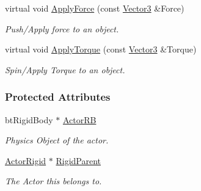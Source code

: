 \begin{DoxyCompactItemize}
virtual void \hyperlink{classphys_1_1ActorRigidPhysicsSettings_a3738b083fd0c21e07176c302f63ce993}{ApplyForce} (const \hyperlink{classphys_1_1Vector3}{Vector3} \&Force)
\begin{DoxyCompactList}\small\item\em Push/Apply force to an object. \item\end{DoxyCompactList}\item 
virtual void \hyperlink{classphys_1_1ActorRigidPhysicsSettings_ad95f1a52c00ab5af3add795b547970a5}{ApplyTorque} (const \hyperlink{classphys_1_1Vector3}{Vector3} \&Torque)
\begin{DoxyCompactList}\small\item\em Spin/Apply Torque to an object. \item\end{DoxyCompactList}\end{DoxyCompactItemize}
\subsubsection*{Protected Attributes}
\begin{DoxyCompactItemize}
\item 
\hypertarget{classphys_1_1ActorRigidPhysicsSettings_af92d6c9108279828425390b02612861f}{
btRigidBody $\ast$ \hyperlink{classphys_1_1ActorRigidPhysicsSettings_af92d6c9108279828425390b02612861f}{ActorRB}}
\label{d1/d17/classphys_1_1ActorRigidPhysicsSettings_af92d6c9108279828425390b02612861f}

\begin{DoxyCompactList}\small\item\em Physics Object of the actor. \item\end{DoxyCompactList}\item 
\hypertarget{classphys_1_1ActorRigidPhysicsSettings_a8fe8b3e8632c9ae82fdd091f9628690b}{
\hyperlink{classphys_1_1ActorRigid}{ActorRigid} $\ast$ \hyperlink{classphys_1_1ActorRigidPhysicsSettings_a8fe8b3e8632c9ae82fdd091f9628690b}{RigidParent}}
\label{d1/d17/classphys_1_1ActorRigidPhysicsSettings_a8fe8b3e8632c9ae82fdd091f9628690b}

\begin{DoxyCompactList}\small\item\em The Actor this belongs to. \item\end{DoxyCompactList}\end{DoxyCompactItemize}


